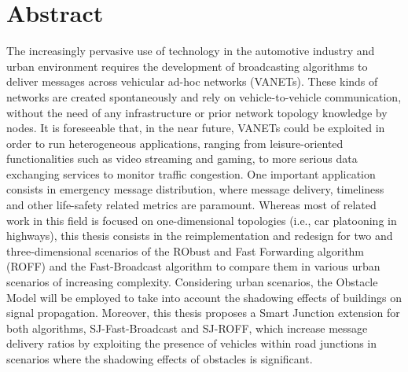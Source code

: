 
\cleardoublepage
{}
{}
\begingroup
\let\clearpage\relax
\let\cleardoublepage\relax
\let\cleardoublepage\relax

\chapter*{Abstract}

The increasingly pervasive use of technology in the automotive industry and urban environment requires the development of broadcasting algorithms to deliver messages across vehicular ad-hoc networks (VANETs). These kinds of networks are created spontaneously and rely on vehicle-to-vehicle communication, without the need of any infrastructure or prior network topology knowledge by nodes. It is foreseeable that, in the near future, VANETs could be exploited in order to run heterogeneous applications, ranging from leisure-oriented functionalities such as video streaming and gaming, to more serious data exchanging services to monitor traffic congestion. One important application consists in emergency message distribution, where message delivery, timeliness and other life-safety related metrics are paramount. Whereas most of related work in this field is focused on one-dimensional topologies (i.e., car platooning in highways), this thesis consists in the reimplementation and redesign for two and three-dimensional scenarios of the RObust and Fast Forwarding algorithm (ROFF) and the Fast-Broadcast algorithm to compare them in various urban scenarios of increasing complexity. Considering urban scenarios, the Obstacle Model will be employed to take into account the shadowing effects of buildings on signal propagation. Moreover, this thesis proposes a Smart Junction extension for both algorithms, SJ-Fast-Broadcast and SJ-ROFF, which increase message delivery ratios by exploiting the presence of vehicles within road junctions in scenarios where the shadowing effects of obstacles is significant.

\endgroup			

\vfill

